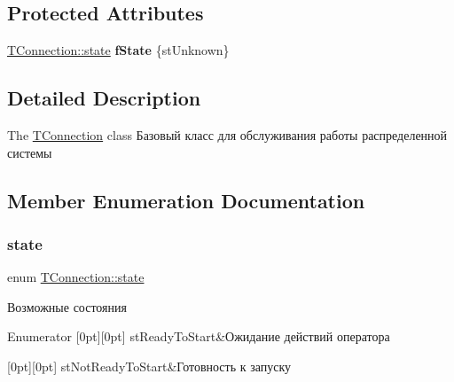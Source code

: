 \subsection*{Protected Attributes}
\begin{DoxyCompactItemize}
\item 
\mbox{\label{class_t_connection_a126c4916b944c5fed1f82fb25a645d9c}} 
\hyperlink{class_t_connection_a93c51547a49faa91936324245c95b7b3}{T\+Connection\+::state} {\bfseries f\+State} \{st\+Unknown\}
\end{DoxyCompactItemize}


\subsection{Detailed Description}
The \hyperlink{class_t_connection}{T\+Connection} class Базовый класс для обслуживания работы распределенной системы 

\subsection{Member Enumeration Documentation}
\mbox{\label{class_t_connection_a93c51547a49faa91936324245c95b7b3}} 
\subsubsection{\texorpdfstring{state}{state}}
{\footnotesize\ttfamily enum \hyperlink{class_t_connection_a93c51547a49faa91936324245c95b7b3}{T\+Connection\+::state}}



Возможные состояния 

\begin{DoxyEnumFields}{Enumerator}
[0pt][0pt]{}\mbox{\label{class_t_connection_a93c51547a49faa91936324245c95b7b3ac673f7deea576e6e3f26d38b392c85ad}} 
st\+Ready\+To\+Start&Ожидание действий оператора \\
\hline

[0pt][0pt]{}\mbox{\label{class_t_connection_a93c51547a49faa91936324245c95b7b3ae98ac105f75a0d6b3aa76553841add2b}} 
st\+Not\+Ready\+To\+Start&Готовность к запуску \\
\hline

\end{DoxyEnumFields}


